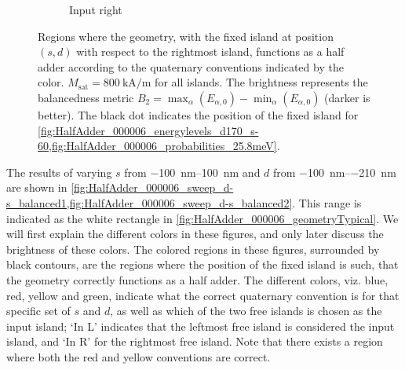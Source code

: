 \documentclass[11pt,a4paper,english,twoside]{article}
\begin{document}
\begin{figure}
\begin{subfigure}[t]{0.594\textwidth}
        \caption{Input right}
    \label{fig:HalfAdder_000006_sweep_d-s_balanced2-R}
    \end{subfigure}
    \caption{Regions where the geometry, with the fixed island at position $(s, d)$ with respect to the rightmost island, functions as a half adder according to the quaternary conventions indicated by the color. $M_\mathrm{sat} = \SI{800}{\kilo\ampere\per\metre}$ for all islands. The brightness represents the balancedness metric $B_2 = \max_\alpha(E_{\alpha,0}) - \min_\alpha(E_{\alpha,0})$ (darker is better). The black dot indicates the position of the fixed island for \cref{fig:HalfAdder_000006_energylevels_d170_s-60,fig:HalfAdder_000006_probabilities_25.8meV}.}
    \label{fig:HalfAdder_000006_sweep_d-s_balanced2}
\end{figure}
The results of varying $s$ from \SIrange{-100}{100}{\nano\metre} and $d$ from \SIrange{-100}{-210}{\nano\metre} are shown in \cref{fig:HalfAdder_000006_sweep_d-s_balanced1,fig:HalfAdder_000006_sweep_d-s_balanced2}. This range is indicated as the white rectangle in \cref{fig:HalfAdder_000006_geometryTypical}. We will first explain the different colors in these figures, and only later discuss the brightness of these colors. The colored regions in these figures, surrounded by black contours, are the regions where the position of the fixed island is such, that the geometry correctly functions as a half adder. The different colors, viz. blue, red, yellow and green, indicate what the correct quaternary convention is for that specific set of $s$ and $d$, as well as which of the two free islands is chosen as the input island; `In L' indicates that the leftmost free island is considered the input island, and `In R' for the rightmost free island. Note that there exists a region where both the red and yellow conventions are correct. \par
\end{document}
